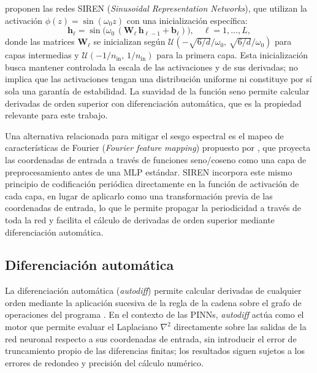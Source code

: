 \textcite{sitzmann2020siren} proponen las redes SIREN
(\textit{Sinusoidal Representation Networks}), que utilizan la activación
$\phi(z) = \sin(\omega_0 z)$ con una inicialización específica:
%
\begin{equation}
    \mathbf{h}_\ell = \sin\!\bigl(\omega_0\,
    (\mathbf{W}_\ell\,\mathbf{h}_{\ell-1} + \mathbf{b}_\ell)\bigr),
    \quad \ell = 1, \ldots, L,
    \label{eq:siren}
\end{equation}
%
donde las matrices $\mathbf{W}_\ell$ se inicializan según
$\mathcal{U}(-\sqrt{6/d}/\omega_0,\, \sqrt{6/d}/\omega_0)$ para capas
intermedias y $\mathcal{U}(-1/n_\text{in},\, 1/n_\text{in})$ para la primera
capa. Esta inicialización busca mantener controlada la escala de las
activaciones y de sus derivadas; no implica que las activaciones tengan una
distribución uniforme ni constituye por sí sola una garantía de estabilidad.
La suavidad de la función seno permite calcular derivadas de orden superior con
diferenciación automática, que es la propiedad relevante para este trabajo.

Una alternativa relacionada para mitigar el sesgo espectral es el mapeo de
características de Fourier (\textit{Fourier feature mapping}) propuesto por
\textcite{tancik2020fourier}, que proyecta las coordenadas de entrada a través
de funciones seno/coseno como una capa de preprocesamiento antes de una MLP
estándar. SIREN incorpora este mismo principio de codificación periódica
directamente en la función de activación de cada capa, en lugar de aplicarlo
como una transformación previa de las coordenadas de entrada, lo que le
permite propagar la periodicidad a través de toda la red y facilita el cálculo
de derivadas de orden superior mediante diferenciación automática.

\subsection{Diferenciación automática}

La diferenciación automática (\textit{autodiff}) permite calcular derivadas de
cualquier orden mediante la aplicación sucesiva de la regla de la cadena sobre
el grafo de operaciones del programa \parencite{baydin2018autodiff}. En el
contexto de las PINNs, \textit{autodiff} actúa como el motor que permite evaluar
el Laplaciano $\nabla^2$ directamente sobre las salidas de la red neuronal
respecto a sus coordenadas de entrada, sin introducir el error de truncamiento
propio de las diferencias finitas; los resultados siguen sujetos a los errores
de redondeo y precisión del cálculo numérico.

